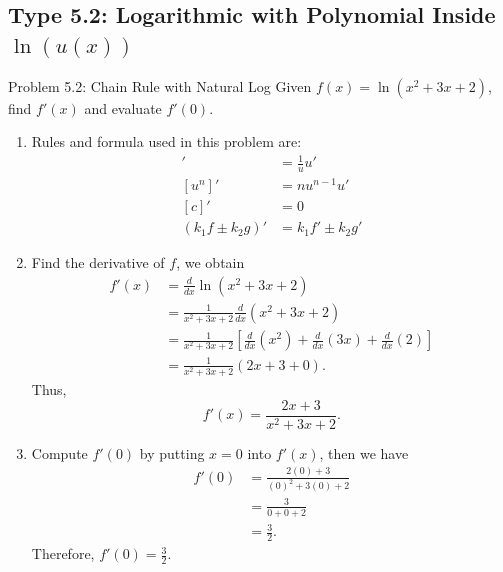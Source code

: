 \documentclass[11pt,a4paper]{article}
\begin{document}
\subsection{Type 5.2: Logarithmic with Polynomial Inside $\ln(u(x))$}
\begin{problembox}{Problem 5.2: Chain Rule with Natural Log}
Given $f(x) = \ln(x^2 + 3x + 2)$, find $f'(x)$ and evaluate $f'(0)$.
\end{problembox}
\begin{solutionbox}
\begin{enumerate}
	\item [Step 1.] Rules and formula used in this problem are:
	\begin{align*}
		[\ln(u)]' &= \frac{1}{u} u' \\
		[u^n]' &= n u^{n-1} u' \\
		[c]' &= 0 \\
		(k_1f \pm k_2 g)' &= k_1f' \pm k_2g'
	\end{align*}
	
	\item [Step 2.] Find the derivative of $f$, we obtain
	\begin{align*}
		f'(x) &= \frac{d}{dx} \ln(x^2 + 3x + 2) \\
		&= \frac{1}{x^2 + 3x + 2} \frac{d}{dx} (x^2 + 3x + 2) \\
		&= \frac{1}{x^2 + 3x + 2} \left[ \frac{d}{dx}(x^2) + \frac{d}{dx}(3x) + \frac{d}{dx}(2) \right] \\
		&= \frac{1}{x^2 + 3x + 2} (2x + 3 + 0).
	\end{align*}
	Thus,
	\begin{equation*}
		f'(x) = \frac{2x + 3}{x^2 + 3x + 2}.
	\end{equation*}
	
	\item [Step 3.] Compute $f'(0)$ by putting $x = 0$ into $f'(x)$, then we have
	\begin{align*}
		f'(0) &= \frac{2(0) + 3}{(0)^2 + 3(0) + 2} \\
		&= \frac{3}{0 + 0 + 2} \\
		&= \frac{3}{2}.
	\end{align*}
	Therefore, $f'(0) = \frac{3}{2}$.
\end{enumerate}
\end{solutionbox}
\end{document}
